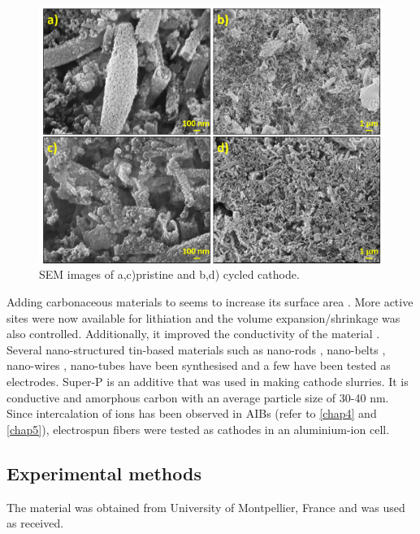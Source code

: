  \begin{figure}[th!]
  \centering
  \includegraphics[width=\textwidth]{Figures/chap6fig/SnO2SEM}
    \caption{SEM images of a,c)pristine and b,d) cycled  cathode.}
  \label{Figures/chap6fig:SnO2SEM}
\end{figure}

Adding carbonaceous materials to  seems to increase its surface area \cite{navarro-suarez_2d_nodate}. More active sites were now available for lithiation and the volume expansion/shrinkage was also controlled. Additionally, it improved the conductivity of the material \cite{nowak_composites_2018}. Several nano-structured tin-based materials such as nano-rods \cite{liu_direct_2009}, nano-belts \cite{duan_single_2005}, nano-wires \cite{huang_situ_2010}, nano-tubes \cite{wang_large-scale_2011} have been synthesised and a few have been tested as electrodes. Super-P is an additive that was used in making cathode slurries. It is conductive and amorphous carbon with an average particle size of 30-40 nm. 
Since intercalation of ions has been observed in AIBs (refer to \ref{chap4} and \ref{chap5}), electrospun  fibers were tested as cathodes in an aluminium-ion cell. 

\subsection{Experimental methods}
The material was obtained from University of Montpellier, France and was used as received. 

